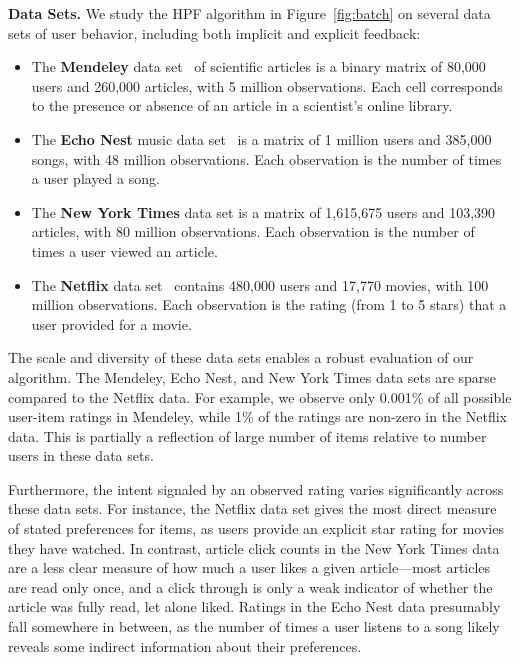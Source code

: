 {\bf Data Sets.} We study the HPF algorithm in Figure~\ref{fig:batch}
on several data sets of user behavior, including both implicit and
explicit feedback:
\begin{itemize}
\item The {\bf Mendeley} data set~\cite{Jack:2010} of scientific
  articles is a binary matrix of 80,000 users and 260,000 articles,
  with 5 million observations.  Each cell corresponds to the presence
  or absence of an article in a scientist's online library.
\item The {\bf Echo Nest} music data set~\cite{Bertin-Mahieux:2011} is
  a matrix of 1 million users and 385,000 songs, with 48 million
  observations.  Each observation is the number of times a user played
  a song.
\item The {\bf New York Times} data set is a matrix of 1,615,675 users
  and 103,390 articles, with 80 million observations.  Each
  observation is the number of times a user viewed an article.

\item The {\bf Netflix} data set~\cite{Koren:2009} contains 480,000
  users and 17,770 movies, with 100 million observations. Each
  observation is the rating (from 1 to 5 stars) that a user provided
  for a movie.
\end{itemize}

The scale and diversity of these data sets enables a robust evaluation
of our algorithm. The Mendeley, Echo Nest, and New York Times data
sets are sparse compared to the Netflix data. For example, we observe
only 0.001\% of all possible user-item ratings in Mendeley, while 1\%
of the ratings are non-zero in the Netflix data. This is partially a
reflection of large number of items relative to number users in these
data sets.

Furthermore, the intent signaled by an observed rating varies
significantly across these data sets. For instance, the Netflix data
set gives the most direct measure of stated preferences for items, as
users provide an explicit star rating for movies they have watched. In
contrast, article click counts in the New York Times data are a less
clear measure of how much a user likes a given article---most articles
are read only once, and a click through is only a weak indicator of
whether the article was fully read, let alone liked. Ratings in the
Echo Nest data presumably fall somewhere in between, as the number of
times a user listens to a song likely reveals some indirect
information about their preferences.

